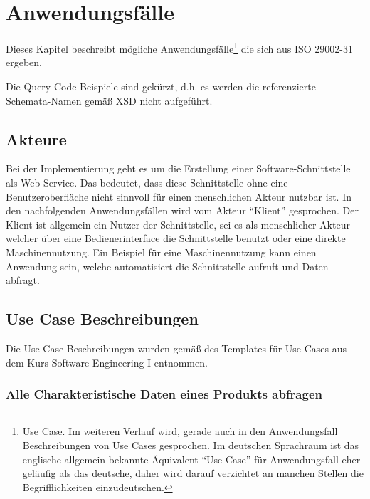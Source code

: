 \section{Anwendungsfälle}\label{kap:Use_Cases}

Dieses Kapitel beschreibt mögliche Anwendungsfälle\footnote{Use Case. Im weiteren Verlauf wird, gerade auch in den Anwendungsfall Beschreibungen von Use Cases gesprochen. Im deutschen Sprachraum ist das englische allgemein bekannte Äquivalent \enquote{Use Case} für Anwendungsfall eher geläufig als das deutsche, daher wird darauf verzichtet an manchen Stellen die Begrifflichkeiten einzudeutschen.} die sich aus ISO 29002-31 ergeben. 

      
Die Query-Code-Beispiele sind gekürzt, d.h. es werden die referenzierte Schemata-Namen gemäß XSD nicht aufgeführt. 


\subsection{Akteure}
Bei der Implementierung geht es um die Erstellung einer Software-Schnittstelle als Web Service. Das bedeutet, dass diese Schnittstelle ohne eine Benutzeroberfläche nicht sinnvoll für einen menschlichen Akteur nutzbar ist. In den nachfolgenden Anwendungsfällen wird vom Akteur \enquote{Klient} gesprochen. Der Klient ist allgemein ein Nutzer der Schnittstelle, sei es als menschlicher Akteur welcher über eine Bedienerinterface die Schnittstelle benutzt oder eine direkte Maschinennutzung. Ein Beispiel für eine Maschinennutzung kann einen Anwendung sein, welche automatisiert die Schnittstelle aufruft und Daten abfragt.    


\subsection{Use Case Beschreibungen}

Die Use Case Beschreibungen wurden gemäß des Templates für Use Cases aus dem Kurs Software Engineering I entnommen. 

\subsubsection{Alle Charakteristische Daten eines Produkts abfragen}


